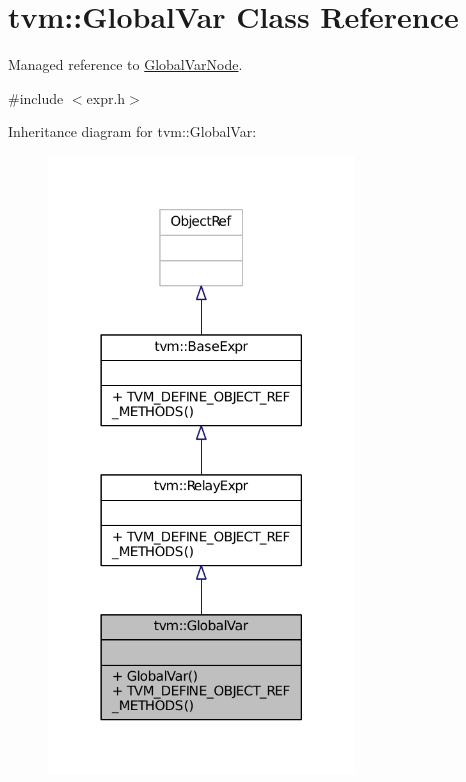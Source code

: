 \hypertarget{classtvm_1_1GlobalVar}{}\section{tvm\+:\+:Global\+Var Class Reference}
\label{classtvm_1_1GlobalVar}


Managed reference to \hyperlink{classtvm_1_1GlobalVarNode}{Global\+Var\+Node}.  




{\ttfamily \#include $<$expr.\+h$>$}



Inheritance diagram for tvm\+:\+:Global\+Var\+:
\nopagebreak
\begin{figure}[H]
\begin{center}
\leavevmode
\includegraphics[width=230pt]{classtvm_1_1GlobalVar__inherit__graph}
\end{center}
\end{figure}


